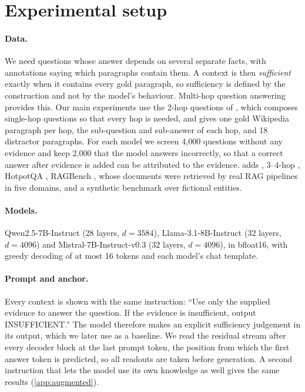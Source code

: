 \section{Experimental setup}
\label{sec:setup}

\paragraph{Data.}
We need questions whose answer depends on several separate facts, with annotations saying which paragraphs contain them. A context is then \emph{sufficient} exactly when it contains every gold paragraph, so sufficiency is defined by the construction and not by the model's behaviour. Multi-hop question answering provides this. Our main experiments use the 2-hop questions of \musique{} \cite{trivedi2022musique}, which composes single-hop questions so that every hop is needed, and gives one gold Wikipedia paragraph per hop, the sub-question and sub-answer of each hop, and 18 distractor paragraphs. For each model we screen 4{,}000 questions without any evidence and keep 2{,}000 that the model answers incorrectly, so that a correct answer after evidence is added can be attributed to the evidence.  adds \twowiki{} \cite{ho2020constructing}, 3--4-hop \musique{}, HotpotQA \cite{yang2018hotpotqa}, RAGBench \cite{friel2024ragbench}, whose documents were retrieved by real RAG pipelines in five domains, and a synthetic benchmark over fictional entities.

\paragraph{Models.}
Qwen2.5-7B-Instruct (28 layers, $d=3584$), Llama-3.1-8B-Instruct (32 layers, $d=4096$) and Mistral-7B-Instruct-v0.3 (32 layers, $d=4096$), in bfloat16, with greedy decoding of at most 16 tokens and each model's chat template.

\paragraph{Prompt and anchor.}
Every context is shown with the same instruction: ``Use only the supplied evidence to answer the question. If the evidence is insufficient, output INSUFFICIENT.'' The model therefore makes an explicit sufficiency judgement in its output, which we later use as a baseline. We read the residual stream after every decoder block at the last prompt token, the position from which the first answer token is predicted, so all readouts are taken before generation. A second instruction that lets the model use its own knowledge as well gives the same results (\cref{app:augmented}).

